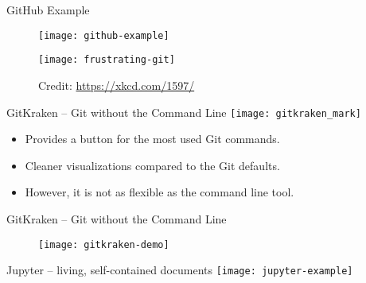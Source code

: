 \documentclass{beamer}
\begin{document}
\begin{frame}{GitHub Example}
  \begin{figure}
    \texttt{[image: github-example]}
  \end{figure}
\end{frame}

\begin{frame}{}
  \begin{figure}
    \texttt{[image: frustrating-git]}
    \caption{
      Credit: \url{https://xkcd.com/1597/}
    }
  \end{figure}
\end{frame}

\begin{frame}{GitKraken -- Git without the Command Line}
  \center \texttt{[image: gitkraken\_mark]}

  \begin{itemize}
    \item Provides a button for the most used Git commands.

    \item Cleaner visualizations compared to the Git defaults.

    \item However, it is not as flexible as the command line tool.
  \end{itemize}
\end{frame}

\begin{frame}{GitKraken -- Git without the Command Line}
  \begin{figure}
    \centering
    \texttt{[image: gitkraken-demo]}
  \end{figure}
\end{frame}






\begin{frame}{Jupyter -- living, self-contained documents}
  \center
  \texttt{[image: jupyter-example]}
\end{frame}
\end{document}
